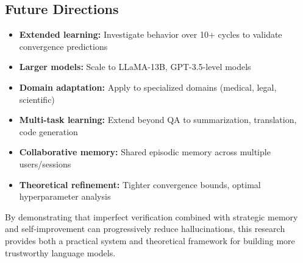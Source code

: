 \documentclass[12pt,a4paper]{article}
\theoremstyle{definition}
\begin{document}
\subsection{Future Directions}

\begin{itemize}
    \item \textbf{Extended learning:} Investigate behavior over 10+ cycles to validate convergence predictions
    \item \textbf{Larger models:} Scale to LLaMA-13B, GPT-3.5-level models
    \item \textbf{Domain adaptation:} Apply to specialized domains (medical, legal, scientific)
    \item \textbf{Multi-task learning:} Extend beyond QA to summarization, translation, code generation
    \item \textbf{Collaborative memory:} Shared episodic memory across multiple users/sessions
    \item \textbf{Theoretical refinement:} Tighter convergence bounds, optimal hyperparameter analysis
\end{itemize}

By demonstrating that imperfect verification combined with strategic memory and self-improvement can progressively reduce hallucinations, this research provides both a practical system and theoretical framework for building more trustworthy language models.
\end{document}
